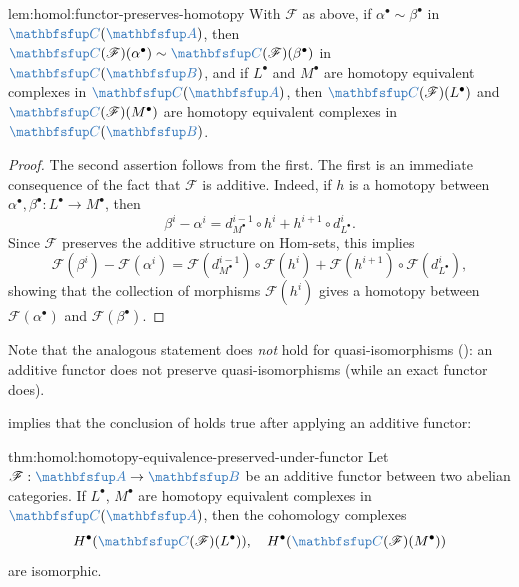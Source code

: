 \begin{lem}{}{lem:homol:functor-preserves-homotopy}
  With $\mathscr{F}$ as above, if $\alpha^\bullet \sim \beta^\bullet$
  in $\categ{C}(\categ{A})$, then
  $\categ{C}(\mathscr{F})(\alpha^\bullet) \sim
  \categ{C}(\mathscr{F})(\beta^\bullet)$ in $\categ{C}(\categ{B})$,
  and if $L^\bullet$ and $M^\bullet$ are homotopy equivalent complexes
  in $\categ{C}(\categ{A})$, then $\categ{C}(\mathscr{F})(L^\bullet)$
  and $\categ{C}(\mathscr{F})(M^\bullet)$ are homotopy equivalent
  complexes in $\categ{C}(\categ{B})$.
\end{lem}

\begin{proof}
  The second assertion follows from the first. The first is an
  immediate consequence of the fact that $\mathscr{F}$ is additive.
  Indeed, if $h$ is a homotopy between
  $\alpha^\bullet, \beta^\bullet : L^\bullet \to M^\bullet$, then
  \[
    \beta^i - \alpha^i = d^{i-1}_{M^\bullet} \circ h^i + h^{i+1} \circ
    d^i_{L^\bullet}.
  \]
  Since $\mathscr{F}$ preserves the additive structure on Hom-sets,
  this implies
  \[
    \mathscr{F}(\beta^i) - \mathscr{F}(\alpha^i) =
    \mathscr{F}(d^{i-1}_{M^\bullet}) \circ \mathscr{F}(h^i) +
    \mathscr{F}(h^{i+1}) \circ \mathscr{F}(d^i_{L^\bullet}),
  \]
  showing that the collection of morphisms $\mathscr{F}(h^i)$ gives a
  homotopy between $\mathscr{F}(\alpha^\bullet)$ and
  $\mathscr{F}(\beta^\bullet)$.
\end{proof}

Note that the analogous statement does \emph{not} hold for
quasi-isomorphisms
():
an additive functor does not preserve quasi-isomorphisms (while an
exact functor does).

 implies that the conclusion of 
holds true after applying an additive functor:

\begin{thm}{}{thm:homol:homotopy-equivalence-preserved-under-functor}
  Let $\mathscr{F} : \categ{A} \to \categ{B}$ be an additive functor
  between two abelian categories. If $L^\bullet$, $M^\bullet$ are
  homotopy equivalent complexes in $\categ{C}(\categ{A})$, then the
  cohomology complexes
  \[
    H^\bullet(\categ{C}(\mathscr{F})(L^\bullet)), \quad
    H^\bullet(\categ{C}(\mathscr{F})(M^\bullet))
  \]
  are isomorphic.
\end{thm}

